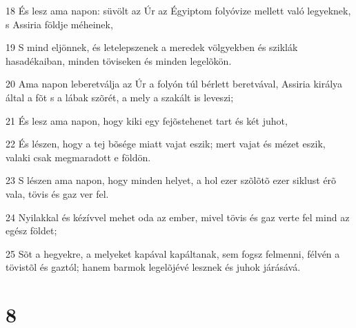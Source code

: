 \par 18 És lesz ama napon: süvölt az Úr az Égyiptom folyóvize mellett való legyeknek, s Assiria földje méheinek,
\par 19 S mind eljönnek, és letelepszenek a meredek völgyekben és sziklák hasadékaiban, minden töviseken és minden legelõkön.
\par 20 Ama napon leberetválja az Úr a folyón túl bérlett beretvával, Assiria királya által a fõt s a lábak szõrét, a mely a szakált is leveszi;
\par 21 És lesz ama napon, hogy kiki egy fejõstehenet tart és két juhot,
\par 22 És lészen, hogy a tej bõsége miatt vajat eszik; mert vajat és mézet eszik, valaki csak megmaradott e földön.
\par 23 S lészen ama napon, hogy minden helyet, a hol ezer szõlõtõ ezer siklust érõ vala, tövis és gaz ver fel.
\par 24 Nyilakkal és kézívvel mehet oda az ember, mivel tövis és gaz verte fel mind az egész földet;
\par 25 Sõt a hegyekre, a melyeket kapával kapáltanak, sem fogsz felmenni, félvén a tövistõl és gaztól; hanem barmok legelõjévé lesznek és juhok járásává.

\chapter{8}

